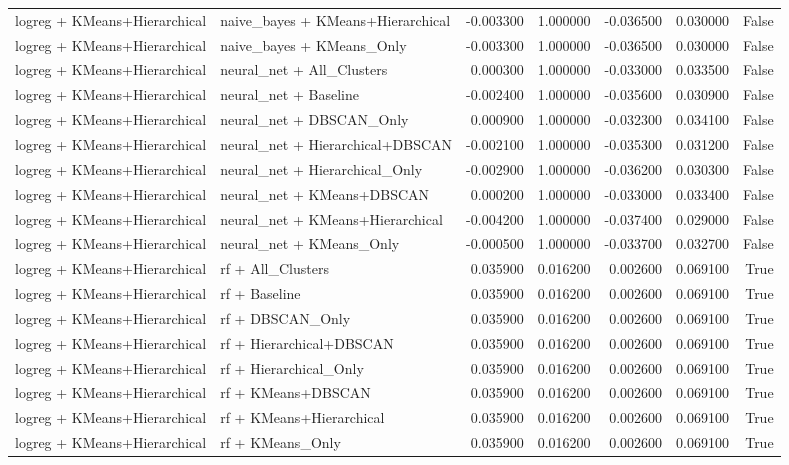\begin{tabular}{llrrrrr}
logreg + KMeans+Hierarchical & naive_bayes + KMeans+Hierarchical & -0.003300 & 1.000000 & -0.036500 & 0.030000 & False \\
logreg + KMeans+Hierarchical & naive_bayes + KMeans_Only & -0.003300 & 1.000000 & -0.036500 & 0.030000 & False \\
logreg + KMeans+Hierarchical & neural_net + All_Clusters & 0.000300 & 1.000000 & -0.033000 & 0.033500 & False \\
logreg + KMeans+Hierarchical & neural_net + Baseline & -0.002400 & 1.000000 & -0.035600 & 0.030900 & False \\
logreg + KMeans+Hierarchical & neural_net + DBSCAN_Only & 0.000900 & 1.000000 & -0.032300 & 0.034100 & False \\
logreg + KMeans+Hierarchical & neural_net + Hierarchical+DBSCAN & -0.002100 & 1.000000 & -0.035300 & 0.031200 & False \\
logreg + KMeans+Hierarchical & neural_net + Hierarchical_Only & -0.002900 & 1.000000 & -0.036200 & 0.030300 & False \\
logreg + KMeans+Hierarchical & neural_net + KMeans+DBSCAN & 0.000200 & 1.000000 & -0.033000 & 0.033400 & False \\
logreg + KMeans+Hierarchical & neural_net + KMeans+Hierarchical & -0.004200 & 1.000000 & -0.037400 & 0.029000 & False \\
logreg + KMeans+Hierarchical & neural_net + KMeans_Only & -0.000500 & 1.000000 & -0.033700 & 0.032700 & False \\
logreg + KMeans+Hierarchical & rf + All_Clusters & 0.035900 & 0.016200 & 0.002600 & 0.069100 & True \\
logreg + KMeans+Hierarchical & rf + Baseline & 0.035900 & 0.016200 & 0.002600 & 0.069100 & True \\
logreg + KMeans+Hierarchical & rf + DBSCAN_Only & 0.035900 & 0.016200 & 0.002600 & 0.069100 & True \\
logreg + KMeans+Hierarchical & rf + Hierarchical+DBSCAN & 0.035900 & 0.016200 & 0.002600 & 0.069100 & True \\
logreg + KMeans+Hierarchical & rf + Hierarchical_Only & 0.035900 & 0.016200 & 0.002600 & 0.069100 & True \\
logreg + KMeans+Hierarchical & rf + KMeans+DBSCAN & 0.035900 & 0.016200 & 0.002600 & 0.069100 & True \\
logreg + KMeans+Hierarchical & rf + KMeans+Hierarchical & 0.035900 & 0.016200 & 0.002600 & 0.069100 & True \\
logreg + KMeans+Hierarchical & rf + KMeans_Only & 0.035900 & 0.016200 & 0.002600 & 0.069100 & True \\

\end{tabular}

